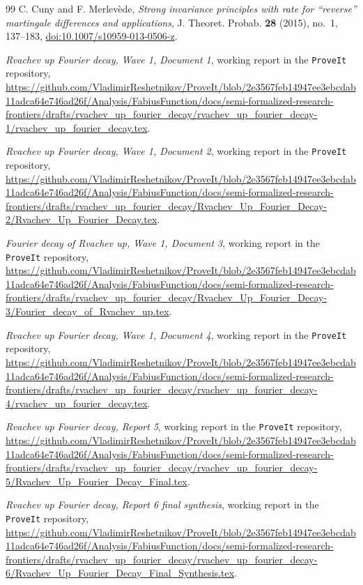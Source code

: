 \documentclass[11pt,oneside]{article}
\numberwithin{equation}{section}
\theoremstyle{definition}
\theoremstyle{remark}
\begin{document}
\begin{thebibliography}{99}
C. Cuny and F. Merlev\`ede,
\emph{Strong invariance principles with rate for ``reverse'' martingale differences and
applications},
J. Theoret. Probab. \textbf{28} (2015), no.~1, 137--183,
\href{https://doi.org/10.1007/s10959-013-0506-z}{doi:10.1007/s10959-013-0506-z}.

\emph{Rvachev up Fourier decay, Wave 1, Document 1}, working report in the
\texttt{ProveIt} repository,
\url{https://github.com/VladimirReshetnikov/ProveIt/blob/2e3567feb14947ee3ebcdab11adca64e746ad26f/Analysis/FabiusFunction/docs/semi-formalized-research-frontiers/drafts/rvachev_up_fourier_decay/rvachev_up_fourier_decay-1/rvachev_up_fourier_decay.tex}.

\emph{Rvachev up Fourier decay, Wave 1, Document 2}, working report in the
\texttt{ProveIt} repository,
\url{https://github.com/VladimirReshetnikov/ProveIt/blob/2e3567feb14947ee3ebcdab11adca64e746ad26f/Analysis/FabiusFunction/docs/semi-formalized-research-frontiers/drafts/rvachev_up_fourier_decay/Rvachev_Up_Fourier_Decay-2/Rvachev_Up_Fourier_Decay.tex}.

\emph{Fourier decay of Rvachev up, Wave 1, Document 3}, working report in the
\texttt{ProveIt} repository,
\url{https://github.com/VladimirReshetnikov/ProveIt/blob/2e3567feb14947ee3ebcdab11adca64e746ad26f/Analysis/FabiusFunction/docs/semi-formalized-research-frontiers/drafts/rvachev_up_fourier_decay/Rvachev_Up_Fourier_Decay-3/Fourier_decay_of_Rvachev_up.tex}.

\emph{Rvachev up Fourier decay, Wave 1, Document 4}, working report in the
\texttt{ProveIt} repository,
\url{https://github.com/VladimirReshetnikov/ProveIt/blob/2e3567feb14947ee3ebcdab11adca64e746ad26f/Analysis/FabiusFunction/docs/semi-formalized-research-frontiers/drafts/rvachev_up_fourier_decay/rvachev_up_fourier_decay-4/rvachev_up_fourier_decay.tex}.

\emph{Rvachev up Fourier decay, Report 5}, working report in the
\texttt{ProveIt} repository,
\url{https://github.com/VladimirReshetnikov/ProveIt/blob/2e3567feb14947ee3ebcdab11adca64e746ad26f/Analysis/FabiusFunction/docs/semi-formalized-research-frontiers/drafts/rvachev_up_fourier_decay/rvachev_up_fourier_decay-5/Rvachev_Up_Fourier_Decay_Final.tex}.

\emph{Rvachev up Fourier decay, Report 6 final synthesis}, working report in the
\texttt{ProveIt} repository,
\url{https://github.com/VladimirReshetnikov/ProveIt/blob/2e3567feb14947ee3ebcdab11adca64e746ad26f/Analysis/FabiusFunction/docs/semi-formalized-research-frontiers/drafts/rvachev_up_fourier_decay/rvachev_up_fourier_decay-6/Rvachev_Up_Fourier_Decay_Final_Synthesis.tex}.


\end{thebibliography}
\end{document}
